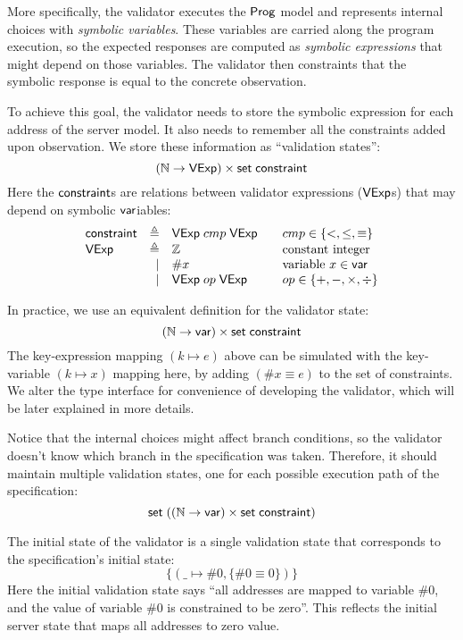More specifically, the validator executes the $\mathsf{Prog}$ model and represents
internal choices with {\em symbolic variables}.  These variables are carried
along the program execution, so the expected responses are computed as {\em
  symbolic expressions} that might depend on those variables.  The validator
then constraints that the symbolic response is equal to the concrete
observation.

To achieve this goal, the validator needs to store the symbolic expression for
each address of the server model.  It also needs to remember all the constraints
added upon observation.  We store these information as ``validation states'':
\[(\mathbb N\to\mathsf{VExp})\times\mathsf{set}\;\mathsf{constraint}\]
Here the $\mathsf{constraint}$s are relations between validator expressions ($\mathsf{VExp}$s)
that may depend on symbolic $\mathsf{var}$iables:
\[\begin{array}{lrl@{\qquad}l}
\constraint&\triangleq&\Vexp\ccmp\Vexp&cmp\in\{<,\le,\equiv\}\\
\Vexp&\triangleq&\Int&\text{constant integer}\\
&\mid&\#x&\text{variable }x\in\Var\\
&\mid&\Vexp\oop\Vexp&op\in\{+,-,\times,\div\}\\
\end{array}\]

In practice, we use an equivalent definition for the validator state:
\[(\mathbb N\to\mathsf{var})\times\mathsf{set}\;\mathsf{constraint}\]
The key-expression mapping $(k\mapsto e)$ above can be simulated with the
key-variable $(k\mapsto x)$ mapping here, by adding $(\#x\equiv e)$ to the set
of constraints.  We alter the type interface for convenience of developing the
validator, which will be later explained in more details.

Notice that the internal choices might affect branch conditions, so the
validator doesn't know which branch in the specification was taken.  Therefore,
it should maintain multiple validation states, one for each possible execution
path of the specification:
\[\mathsf{set}\;((\mathbb N\to\mathsf{var})\times\mathsf{set}\;\mathsf{constraint})\]

The initial state of the validator is a single validation state that corresponds
to the specification's initial state:
\[\{(\_\mapsto\#0,\{\#0\equiv0\})\}\]
Here the initial validation state says ``all addresses are mapped to variable
$\#0$, and the value of variable $\#0$ is constrained to be zero''.  This
reflects the initial server state that maps all addresses to zero value.

